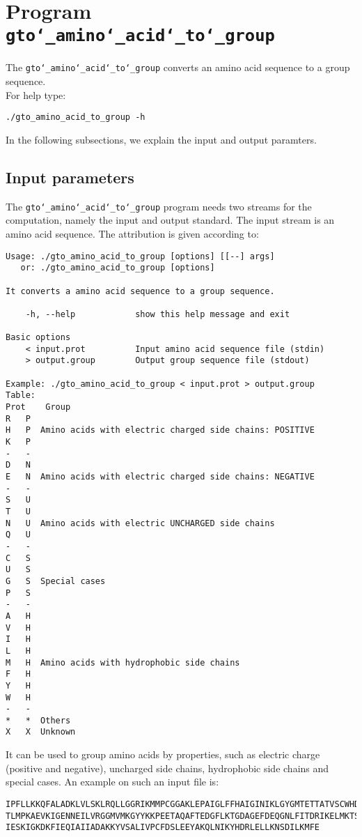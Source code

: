 \section{Program \texttt{gto\char`_amino\char`_acid\char`_to\char`_group}}

The \texttt{gto\char`_amino\char`_acid\char`_to\char`_group} converts an amino acid sequence to a group 
sequence.\\
For help type:
\begin{lstlisting}
./gto_amino_acid_to_group -h
\end{lstlisting}
In the following subsections, we explain the input and output paramters.

\subsection*{Input parameters}

The \texttt{gto\char`_amino\char`_acid\char`_to\char`_group} program needs two streams for the computation,
namely the input and output standard. The input stream is an amino acid sequence.
The attribution is given according to:
\begin{lstlisting}
Usage: ./gto_amino_acid_to_group [options] [[--] args]
   or: ./gto_amino_acid_to_group [options]

It converts a amino acid sequence to a group sequence.

    -h, --help            show this help message and exit

Basic options
    < input.prot          Input amino acid sequence file (stdin)
    > output.group        Output group sequence file (stdout)

Example: ./gto_amino_acid_to_group < input.prot > output.group
Table:
Prot	Group
R	P
H	P  Amino acids with electric charged side chains: POSITIVE
K	P
-	-
D	N
E	N  Amino acids with electric charged side chains: NEGATIVE
-	-
S	U
T	U
N	U  Amino acids with electric UNCHARGED side chains
Q	U
-	-
C	S
U	S
G	S  Special cases
P	S
-	-
A	H
V	H
I	H
L	H
M	H  Amino acids with hydrophobic side chains
F	H
Y	H
W	H
-	-
*	*  Others
X	X  Unknown
\end{lstlisting}
It can be used to group amino acids by properties, such as electric charge (positive
and negative), uncharged side chains, hydrophobic side chains and special cases.
An example on such an input file is:
\begin{lstlisting}
IPFLLKKQFALADKLVLSKLRQLLGGRIKMMPCGGAKLEPAIGLFFHAIGINIKLGYGMTETTATVSCWHDFQFNPNSIG
TLMPKAEVKIGENNEILVRGGMVMKGYYKKPEETAQAFTEDGFLKTGDAGEFDEQGNLFITDRIKELMKTSNGKYIAPQY
IESKIGKDKFIEQIAIIADAKKYVSALIVPCFDSLEEYAKQLNIKYHDRLELLKNSDILKMFE
\end{lstlisting}

